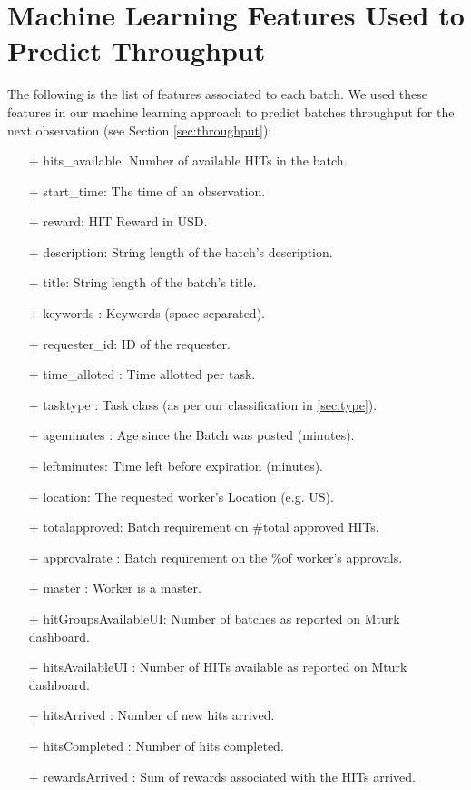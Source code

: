 \appendix

\label{ap:feats}
\section{Machine Learning Features Used to Predict Throughput}
The following is the list of features associated to each batch. We used these features in our machine learning approach to predict batches throughput for the next observation (see Section \ref{sec:throughput}):
\begin{itemize}[noitemsep,topsep=0pt,parsep=0pt,partopsep=0pt]
\item[+] hits\_available:  Number of available HITs in the batch.
\item[+] start\_time:  The time of an observation.
\item[+] reward: HIT Reward in USD.
\item[+] description:  String length of the batch's description.
\item[+] title: String length of the batch's title.
\item[+] keywords : Keywords (space separated).
\item[+] requester\_id:   ID of the requester.
\item[+] time\_alloted : Time allotted per task.
\item[+] tasktype : Task class (as per our classification in \ref{sec:type}).
\item[+] ageminutes : Age since the Batch was posted (minutes).
\item[+] leftminutes: Time left before expiration (minutes).
\item[+] location: The requested worker's Location (e.g. US).
\item[+] totalapproved: Batch requirement on \#total approved HITs.
\item[+] approvalrate : Batch requirement on the \%of worker's approvals.
\item[+] master : Worker is a master.
\item[+] hitGroupsAvailableUI: Number of batches as reported on Mturk dashboard.
\item[+] hitsAvailableUI : Number of HITs available as reported on Mturk dashboard.
\item[+] hitsArrived : Number of new hits arrived.
\item[+] hitsCompleted : Number of hits completed.
\item[+] rewardsArrived : Sum of rewards associated with the HITs arrived.

\end{itemize}
